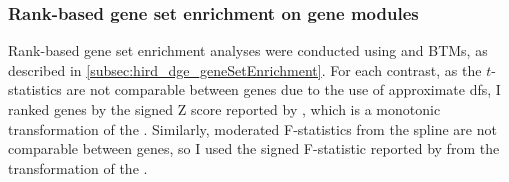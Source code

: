 

\subsubsection{Rank-based gene set enrichment on gene modules}

Rank-based gene set enrichment analyses were conducted using  \autocite{weiner3rd2016TmodPackageGeneral} and \glspl{BTM}, as described in \cref{subsec:hird_dge_geneSetEnrichment}.
%
For each contrast, 
as the $t$-statistics are not comparable between genes due to the use of approximate \glspl{df},
I ranked genes by the signed Z score reported by , which is a monotonic transformation of the \pvalue{}.
Similarly, moderated F-statistics from the spline are not comparable between genes, so I used the signed F-statistic reported by  from the transformation of the \pvalue{}.

